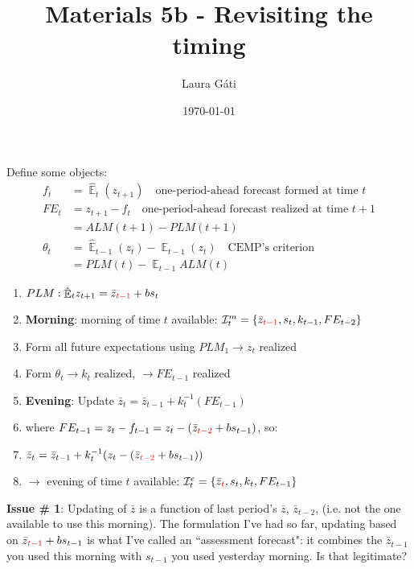 \documentclass[11pt]{article}
\renewcommand{\[}{\begin{equation}}
\renewcommand{\]}{\end{equation}}
\DeclareMathOperator{\E}{\mathbb{E}}
\begin{document}
\linespread{1.0}

\title{Materials 5b - Revisiting the timing}
\author{Laura G\'ati} 
\date{\today}
\maketitle




Define some objects:
\begin{align}
f_t &= \hat{\E}_t(z_{t+1}) \quad \text{one-period-ahead forecast formed at time } t \\
FE_t & = z_{t+1}-f_t \quad \text{one-period-ahead forecast realized at time } t+1 \\
& = ALM(t+1) - PLM(t+1) \\
\theta_t &=  \hat{\E}_{t-1}(z_{t}) - \E_{t-1}(z_{t}) \quad \text{CEMP's criterion} \\
& = PLM(t) - \E_{t-1}ALM(t)
\end{align}


\begin{enumerate}
\item[] $PLM: \hat{\E}_t z_{t+1} = \bar{z}_{\color{red}{t-1}} + bs_t$
\item[] \textbf{Morning}: morning of time $t$ available: $\mathcal{I}_t^m = \{\bar{z}_{\color{red}{t-1}}, s_t, k_{t-1}, FE_{t-2}\}$
\item Form all future expectations using $PLM_1 \rightarrow z_t$ realized 
\item Form $\theta_t \rightarrow k_t$ realized, $\rightarrow FE_{t-1}$ realized 
\item \textbf{Evening}: Update $\bar{z}_t = \bar{z}_{t-1} + k_t^{-1}(FE_{t-1})$
\item[] where $FE_{t-1} = z_{t}-f_{t-1} = z_{t}-(\bar{z}_{\color{red}{t-2}} + bs_{t-1})$, so:
\item[] $\bar{z}_t = \bar{z}_{t-1} + k_t^{-1}(z_{t}-(\bar{z}_{\color{red}{t-2}} + bs_{t-1}))$
\item[] $\rightarrow$ evening of time $t$ available: $\mathcal{I}_t^e = \{\bar{z}_{\color{red}{t}}, s_t, k_{t}, FE_{t-1}\}$
\end{enumerate}

\textbf{Issue \# 1}: Updating of $\bar{z}$ is a function of last period's $\bar{z}$, $\bar{z}_{t-2}$, (i.e. not the one available to use this morning). The formulation I've had so far, updating based on $\bar{z}_{\color{red}{t-1}} + bs_{t-1}$ is what I've called an ``assessment forecast": it combines the $\bar{z}_{t-1}$ you used this morning with $s_{t-1}$ you used yesterday morning. Is that legitimate?
\end{document}
